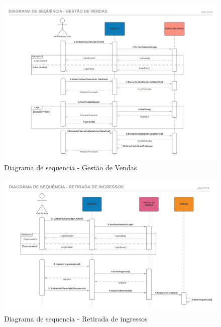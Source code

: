 \documentclass[12pt]{article}
\begin{document}
    \begin{figure}[h]
        \centering
        \includegraphics[scale=0.5]{./Imagens/DiagramasDeSequencia/DiagramaDeSequencia4.png}
        \caption{Diagrama de sequencia - Gestão de Vendas}
        \label{fig:DiagramaSequencia04}
    \end{figure}
    \FloatBarrier

    \begin{figure}[h]
        \centering
        \includegraphics[scale=0.5]{./Imagens/DiagramasDeSequencia/DiagramaDeSequencia5.png}
        \caption{Diagrama de sequencia - Retirada de ingressos}
        \label{fig:DiagramaSequencia05}
    \end{figure}
    \FloatBarrier
\end{document}
